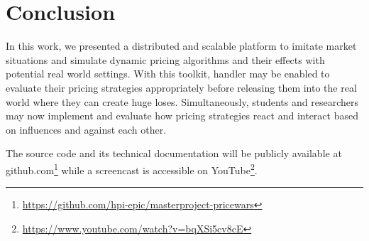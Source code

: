 \section{Conclusion}
\label{sec:conclusion}
%
In this work, we presented a distributed and scalable platform to imitate market situations and simulate dynamic pricing algorithms and their effects with potential real world settings. With this toolkit, handler may be enabled to evaluate their pricing strategies appropriately before releasing them into the real world where they can create huge loses. Simultaneously, students and researchers may now implement and evaluate how pricing strategies react and interact based on influences and against each other.

The source code and its technical documentation will be publicly available at github.com\footnote{\url{https://github.com/hpi-epic/masterproject-pricewars}}
while a screencast is accessible on YouTube\footnote{\url{https://www.youtube.com/watch?v=bqXSi5cv8cE}}.

